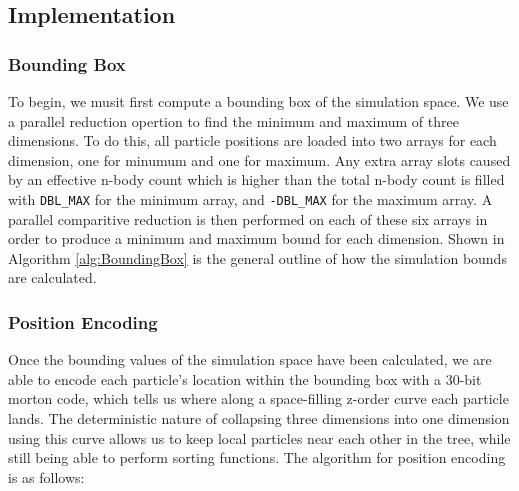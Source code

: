 \documentclass{thesis}
\begin{document}
\subsection{Implementation}
\subsubsection{Bounding Box}
To begin, we musit first compute a bounding box of the simulation space. We use a parallel reduction opertion to find the minimum and maximum of three dimensions. To do this, all particle positions are loaded into two arrays for each dimension, one for minumum and one for maximum. Any extra array slots caused by an effective n-body count which is higher than the total n-body count is filled with \verb|DBL_MAX| for the minimum array, and \verb|-DBL_MAX| for the maximum array. A parallel comparitive reduction is then performed on each of these six arrays in order to produce a minimum and maximum bound for each dimension. Shown in Algorithm \ref{alg:BoundingBox} is the general outline of how the simulation bounds are calculated. 
\subsubsection{Position Encoding}
Once the bounding values of the simulation space have been calculated, we are able to encode each particle's location within the bounding box with a 30-bit morton code, which tells us where along a space-filling z-order curve each particle lands. The deterministic nature of collapsing three dimensions into one dimension using this curve allows us to keep local particles near each other in the tree, while still being able to perform sorting functions. The algorithm for position encoding is as follows:
\end{document}
